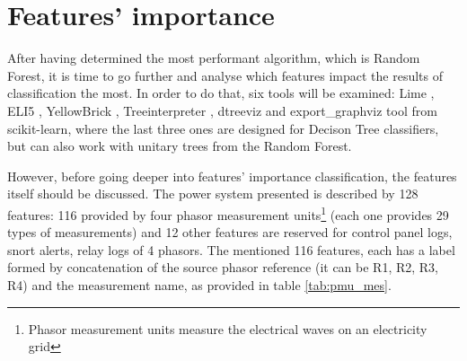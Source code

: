 \chapter{Features' importance}

After having determined the most performant algorithm, which is Random Forest, it is time to go further and analyse which features impact the results of classification the most. In order to do that, six tools will be examined: Lime \cite{lime}, ELI5 \cite{mikhail_korobov_eli5_nodate}, YellowBrick \cite{bengfort_yellowbrick_2018}, Treeinterpreter \cite{ando_saabas_treeinterpreter_nodate}, dtreeviz \cite{terence_parr_dtreeviz_nodate} and export\_graphviz tool from scikit-learn, where the last three ones are designed for Decison Tree classifiers, but can also work with unitary trees from the Random Forest.

However, before going deeper into features' importance classification, the features itself should be discussed. The power system presented \cite{adhikari_power_2014} is described by 128 features: 116 provided by four phasor measurement units\footnote{Phasor measurement units measure the electrical waves on an electricity grid} (each one provides 29 types of measurements) and 12 other features are reserved for control panel logs, snort alerts, relay logs of 4 phasors. The mentioned 116 features, each has a label formed by concatenation of the source phasor reference (it can be R1, R2, R3, R4) and the measurement name, as provided in table \ref{tab:pmu_mes}.

